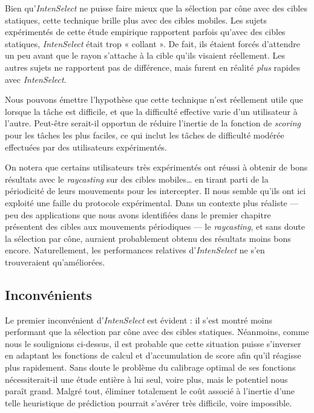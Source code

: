 	Bien qu'\emph{IntenSelect} ne puisse faire mieux que la sélection par cône avec des cibles statiques, cette technique brille plus avec des cibles mobiles. Les sujets expérimentés de cette étude empirique rapportent parfois qu'avec des cibles statiques, \emph{IntenSelect} était trop « collant ». De fait, ils étaient forcés d'attendre un peu avant que le rayon s'attache à la cible qu'ils visaient réellement. Les autres sujets ne rapportent pas de différence, mais furent en réalité \emph{plus} rapides avec \emph{IntenSelect}.
	
	Nous pouvons émettre l'hypothèse que cette technique n'est réellement utile que lorsque la tâche est difficile, et que la difficulté effective varie d'un utilisateur à l'autre. Peut-être serait-il opportun de réduire l'inertie de la fonction de \emph{scoring} pour les tâches les plus faciles, ce qui inclut les tâches de difficulté modérée effectuées par des utilisateurs expérimentés.
	
	On notera que certains utilisateurs très expérimentés ont réussi à obtenir de bons résultats avec le \emph{raycasting} sur des cibles mobiles\ldots{} en tirant parti de la périodicité de leurs mouvements pour les intercepter. Il nous semble qu'ils ont ici exploité une faille du protocole expérimental. Dans un contexte plus réaliste --- peu des applications que nous avons identifiées dans le premier chapitre présentent des cibles aux mouvements périodiques --- le \emph{raycasting}, et sans doute la sélection par cône, auraient probablement obtenu des résultats moins bons encore. Naturellement, les performances relatives d'\emph{IntenSelect} ne s'en trouveraient qu'améliorées.
	
	\subsection{Inconvénients}
	Le premier inconvénient d'\emph{IntenSelect} est évident : il s'est montré moins performant que la sélection par cône avec des cibles statiques. Néanmoins, comme nous le soulignions ci-dessus, il est probable que cette situation puisse s'inverser en adaptant les fonctions de calcul et d'accumulation de score afin qu'il réagisse plus rapidement. Sans doute le problème du calibrage optimal de ses fonctions nécessiterait-il une étude entière à lui seul, voire plus, mais le potentiel nous paraît grand. Malgré tout, éliminer totalement le coût associé à l'inertie d'une telle heuristique de prédiction pourrait s'avérer très difficile, voire impossible.
	
